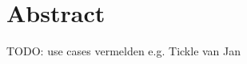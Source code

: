 \section*{Abstract}\enlargethispage{1.5\baselineskip}

TODO: use cases vermelden e.g. Tickle van Jan